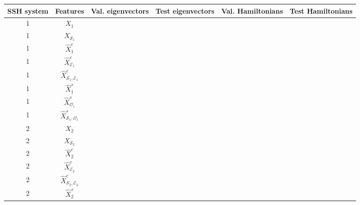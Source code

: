 \documentclass[10pt]{revtex4-1}
\newcommand\accPrec{4}  %
\newcommand{\tableRow}[1]{\\[#1 cm]}
\newcommand{\tableRowHeader}[1]{\\[#1 cm]\hline}
\newcommand\tableRowHeaderEnd{\tableRowHeader{0.3}}
\newcommand\tableRowEnd{\tableRow{0.15}}
\newcommand\SSHSys{SSH system}
\newcommand\Feat{Features}
\newcommand\ValEig{Val. eigenvectors}
\newcommand\TestEig{Test eigenvectors}
\newcommand\ValHam{Val. Hamiltonians}
\newcommand\TestHam{Test Hamiltonians}
\newcommand\xOne{$X_1$}
\newcommand\xOneEigVal{\fpeval{round(0.96392276,\accPrec)}}
\newcommand\xOneEigTest{\fpeval{round(0.78966836492891,\accPrec)}}
\newcommand\xOneHamVal{\fpeval{round(1.0,\accPrec)}}
\newcommand\xOneHamTest{\fpeval{round(0.9918720379146919,\accPrec)}}
\newcommand\xSOne{$X_{\mathcal{S}_1}$}
\newcommand\xSOneEigVal{\fpeval{round(0.9444134200000001,\accPrec)}}
\newcommand\xSOneEigTest{\fpeval{round(0.7763444312796207,\accPrec)}}
\newcommand\xSOneHamVal{\fpeval{round(0.9853300000000002,\accPrec)}}
\newcommand\xcOne{$\hat{X}^c_1$}
\newcommand\xcOneEigVal{\fpeval{round(0.9521145999999999,\accPrec)}}
\newcommand\xcOneEigTest{\fpeval{round(0.7373592417061612,\accPrec)}}
\newcommand\xcOneHamVal{\fpeval{round(0.9975820000000002,\accPrec)}}
\newcommand\xcOneHamTest{\fpeval{round(0.9916232227488153,\accPrec)}}
\newcommand\xcEOne{$\hat{X}^c_{\mathcal{E}_1}$}
\newcommand\xcEOneEigVal{\fpeval{round(0.8280291200000001,\accPrec)}}
\newcommand\xcEOneEigTest{\fpeval{round(0.6066537914691943,\accPrec)}}
\newcommand\xcEOneHamVal{\fpeval{round(0.997906,\accPrec)}}
\newcommand\xcEOneHamTest{\fpeval{round(0.9190876777251185,\accPrec)}}
\newcommand\xcSEOne{$\hat{X}^c_{\mathcal{S}_1,\mathcal{E}_1}$}
\newcommand\xcSEOneEigVal{\fpeval{round(0.9444223399999998,\accPrec)}}
\newcommand\xcSEOneEigTest{\fpeval{round(0.8176174170616113,\accPrec)}}
\newcommand\xcSEOneHamVal{\fpeval{round(0.9853120000000001,\accPrec)}}
\newcommand\xcSEOneHamTest{\fpeval{round(0.9933530805687205,\accPrec)}}
\newcommand\xsOne{$\hat{X}^s_1$}
\newcommand\xsOneEigVal{\fpeval{round(0.9533083600000001,\accPrec)}}
\newcommand\xsOneEigTest{\fpeval{round(0.7313738151658769,\accPrec)}}
\newcommand\xsOneHamVal{\fpeval{round(0.9905759999999999,\accPrec)}}
\newcommand\xsOneHamTest{\fpeval{round(0.9855568720379146,\accPrec)}}
\newcommand\xsOOne{$\hat{X}^s_{\mathcal{O}_1}$}
\newcommand\xsOOneEigVal{\fpeval{round(0.6941595600000001,\accPrec)}}
\newcommand\xsOOneEigTest{\fpeval{round(0.5419954976303317,\accPrec)}}
\newcommand\xsOOneHamVal{\fpeval{round(0.7088179999999998,\accPrec)}}
\newcommand\xsOOneHamTest{\fpeval{round(0.4797630331753555,\accPrec)}}
\newcommand\xsSOOne{$\hat{X}^s_{\mathcal{S}_1,\mathcal{O}_1}$}
\newcommand\xsSOOneEigVal{\fpeval{round(0.9456364800000001,\accPrec)}}
\newcommand\xsSOOneEigTest{\fpeval{round(0.7818372037914694,\accPrec)}}
\newcommand\xsSOOneHamVal{\fpeval{round(0.9853839999999998,\accPrec)}}
\newcommand\xsSOOneHamTest{\fpeval{round(0.9398933649289098,\accPrec)}}
\newcommand\xTwo{$X_2$}
\newcommand\xTwoEigVal{\fpeval{round(0.9708922101449275,\accPrec)}}
\newcommand\xTwoEigTest{\fpeval{round(0.6634109429569267,\accPrec)}}
\newcommand\xTwoHamVal{\fpeval{round(0.9972499999999997,\accPrec)}}
\newcommand\xTwoHamTest{\fpeval{round(0.879697322467986,\accPrec)}}
\newcommand\xSTwo{$X_{\mathcal{S}_2}$}
\newcommand\xSTwoEigVal{\fpeval{round(0.9589830072463768,\accPrec)}}
\newcommand\xSTwoEigTest{\fpeval{round(0.6168351571594877,\accPrec)}}
\newcommand\xSTwoHamVal{\fpeval{round(0.9961050724637681,\accPrec)}}
\newcommand\xcTwo{$\hat{X}^c_2$}
\newcommand\xcTwoEigVal{\fpeval{round(0.9740357971014493,\accPrec)}}
\newcommand\xcTwoEigTest{\fpeval{round(0.6895051222351573,\accPrec)}}
\newcommand\xcTwoHamVal{\fpeval{round(0.9976050724637681,\accPrec)}}
\newcommand\xcTwoHamTest{\fpeval{round(0.8862281722933641,\accPrec)}}
\newcommand\xcETwo{$\hat{X}^c_{\mathcal{E}_2}$}
\newcommand\xcETwoEigVal{\fpeval{round(0.8989626449275362,\accPrec)}}
\newcommand\xcETwoEigTest{\fpeval{round(0.5356883585564609,\accPrec)}}
\newcommand\xcETwoHamVal{\fpeval{round(0.9954927536231883,\accPrec)}}
\newcommand\xcETwoHamTest{\fpeval{round(0.7896856810244468,\accPrec)}}
\newcommand\xcSETwo{$\hat{X}^c_{\mathcal{S}_2,\mathcal{E}_2}$}
\newcommand\xcSETwoEigVal{\fpeval{round(0.8998827173913044,\accPrec)}}
\newcommand\xcSETwoEigTest{\fpeval{round(0.5029968568102445,\accPrec)}}
\newcommand\xcSETwoHamVal{\fpeval{round(0.9956086956521739,\accPrec)}}
\newcommand\xcSETwoHamTest{\fpeval{round(0.7670896391152502,\accPrec)}}
\newcommand\xsTwo{$\hat{X}^s_2$}
\newcommand\xsTwoEigVal{\fpeval{round(0.9735059057971014,\accPrec)}}
\newcommand\xsTwoEigTest{\fpeval{round(0.6878407450523867,\accPrec)}}
\newcommand\xsTwoHamVal{\fpeval{round(0.9970652173913043,\accPrec)}}
\newcommand\xsTwoHamTest{\fpeval{round(0.8898835855646101,\accPrec)}}
\begin{document}
\begin{table}
\begin{tabular}{||c@{\hskip 0.3in} c@{\hskip 0.3in} c@{\hskip 0.3in} c@{\hskip 0.3in} c@{\hskip 0.3in} c||} 
\toprule
\SSHSys               &\Feat             &\ValEig            &\TestEig           &\ValHam              &\TestHam         \tableRowHeaderEnd 
\midrule
1                     &\xOne             &\xOneEigVal        &\xOneEigTest       &\xOneHamVal          &\xOneHamTest       \tableRowEnd
1                     &\xSOne            &\xSOneEigVal       &\xSOneEigTest      &\xSOneHamVal         &\xSOneHamVal       \tableRowEnd
1                     &\xcOne            &\xcOneEigVal       &\xcOneEigTest      &\xcOneHamVal         &\xcOneHamTest      \tableRowEnd
1                     &\xcEOne           &\xcEOneEigVal      &\xcEOneEigTest     &\xcEOneHamVal        &\xcEOneHamTest     \tableRowEnd
1                     &\xcSEOne          &\xcSEOneEigVal     &\xcSEOneEigTest    &\xcSEOneHamVal       &\xcSEOneHamTest    \tableRowEnd
1                     &\xsOne            &\xsOneEigVal       &\xsOneEigTest      &\xsOneHamVal         &\xsOneHamTest      \tableRowEnd
1                     &\xsOOne           &\xsOOneEigVal      &\xsOOneEigTest     &\xsOOneHamVal        &\xsOOneHamTest     \tableRowEnd
1                     &\xsSOOne          &\xsSOOneEigVal     &\xsSOOneEigTest    &\xsSOOneHamVal       &\xsSOOneHamTest    \tableRowEnd
2                     &\xTwo             &\xTwoEigVal        &\xTwoEigTest       &\xTwoHamVal          &\xTwoHamTest       \tableRowEnd
2                     &\xSTwo            &\xSTwoEigVal       &\xSTwoEigTest      &\xSTwoHamVal         &\xSTwoHamVal       \tableRowEnd
2                     &\xcTwo            &\xcTwoEigVal       &\xcTwoEigTest      &\xcTwoHamVal         &\xcTwoHamTest      \tableRowEnd
2                     &\xcETwo           &\xcETwoEigVal      &\xcETwoEigTest     &\xcETwoHamVal        &\xcETwoHamTest     \tableRowEnd
2                     &\xcSETwo          &\xcSETwoEigVal     &\xcSETwoEigTest    &\xcSETwoHamVal       &\xcSETwoHamTest    \tableRowEnd
2                     &\xsTwo            &\xsTwoEigVal       &\xsTwoEigTest      &\xsTwoHamVal         &\xsTwoHamTest      \tableRowEnd

\end{tabular}
\end{table}
\end{document}
